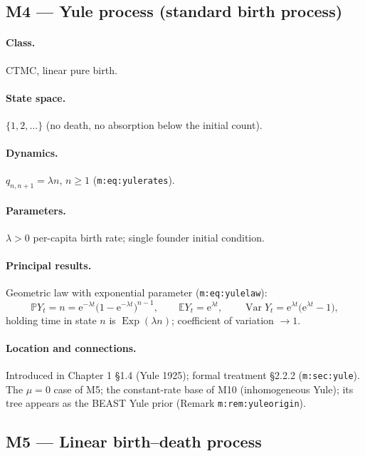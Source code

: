 \documentclass[11pt,a4paper]{article}
\newcommand{\PR}{\mathbb{P}}
\newcommand{\EX}{\mathbb{E}}
\newcommand{\Var}{\operatorname{Var}}
\newcommand{\ee}{\mathrm{e}}
\newcommand{\Exp}{\operatorname{Exp}}
\begin{document}
\subsection{M4 --- Yule process (standard birth process)}

\paragraph{Class.} CTMC, linear pure birth.

\paragraph{State space.} $\{1,2,\ldots\}$ (no death, no absorption below the
initial count).

\paragraph{Dynamics.} $q_{n,n+1}=\lambda n$, $n\ge1$
(\texttt{m:eq:yulerates}).

\paragraph{Parameters.} $\lambda>0$ per-capita birth rate; single founder
initial condition.

\paragraph{Principal results.} Geometric law with exponential parameter
(\texttt{m:eq:yulelaw}):
\[
\PR{Y_t=n}=\ee^{-\lambda t}\bigl(1-\ee^{-\lambda t}\bigr)^{n-1},\qquad
\EX{Y_t}=\ee^{\lambda t},\qquad
\Var{Y_t}=\ee^{\lambda t}\bigl(\ee^{\lambda t}-1\bigr),
\]
holding time in state $n$ is $\Exp(\lambda n)$; coefficient of variation
$\to1$.

\paragraph{Location and connections.} Introduced in Chapter 1 \S1.4 (Yule
1925); formal treatment \S2.2.2 (\texttt{m:sec:yule}). The $\mu=0$ case of
M5; the constant-rate base of M10 (inhomogeneous Yule); its tree appears as
the BEAST Yule prior (Remark \texttt{m:rem:yuleorigin}).

\subsection{M5 --- Linear birth--death process}
\label{sec:M5}
\end{document}
